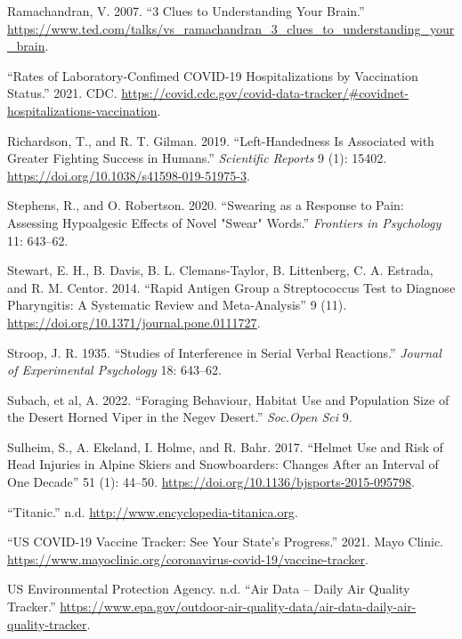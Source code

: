 \documentclass[
]{report}
\newlength{\cslhangindent}
\newenvironment{CSLReferences}[2] %
 {\begin{list}{}{%
  \setlength{\itemindent}{0pt}
  \setlength{\leftmargin}{0pt}
  \setlength{\parsep}{0pt}
  \ifodd #1
   \setlength{\leftmargin}{\cslhangindent}
   \setlength{\itemindent}{-1\cslhangindent}
  \fi
  \setlength{\itemsep}{#2\baselineskip}}}
 {\end{list}}
\begin{document}
\begin{CSLReferences}{1}{0}
Ramachandran, V. 2007. {``3 Clues to Understanding Your Brain.''} \url{https://www.ted.com/talks/vs_ramachandran_3_clues_to_understanding_your_brain}.

{``Rates of Laboratory-Confimed COVID-19 Hospitalizations by Vaccination Status.''} 2021. CDC. \url{https://covid.cdc.gov/covid-data-tracker/\#covidnet-hospitalizations-vaccination}.

Richardson, T., and R. T. Gilman. 2019. {``Left-Handedness Is Associated with Greater Fighting Success in Humans.''} \emph{Scientific Reports} 9 (1): 15402. \url{https://doi.org/10.1038/s41598-019-51975-3}.

Stephens, R., and O. Robertson. 2020. {``Swearing as a Response to Pain: Assessing Hypoalgesic Effects of Novel "Swear" Words.''} \emph{Frontiers in Psychology} 11: 643--62.

Stewart, E. H., B. Davis, B. L. Clemans-Taylor, B. Littenberg, C. A. Estrada, and R. M. Centor. 2014. {``Rapid Antigen Group a Streptococcus Test to Diagnose Pharyngitis: A Systematic Review and Meta-Analysis''} 9 (11). \url{https://doi.org/10.1371/journal.pone.0111727}.

Stroop, J. R. 1935. {``Studies of Interference in Serial Verbal Reactions.''} \emph{Journal of Experimental Psychology} 18: 643--62.

Subach, et al, A. 2022. {``Foraging Behaviour, Habitat Use and Population Size of the Desert Horned Viper in the Negev Desert.''} \emph{Soc.Open Sci} 9.

Sulheim, S., A. Ekeland, I. Holme, and R. Bahr. 2017. {``Helmet Use and Risk of Head Injuries in Alpine Skiers and Snowboarders: Changes After an Interval of One Decade''} 51 (1): 44--50. \url{https://doi.org/10.1136/bjsports-2015-095798}.

{``Titanic.''} n.d. \url{http://www.encyclopedia-titanica.org}.

{``US COVID-19 Vaccine Tracker: See Your State's Progress.''} 2021. Mayo Clinic. \url{https://www.mayoclinic.org/coronavirus-covid-19/vaccine-tracker}.

US Environmental Protection Agency. n.d. {``Air Data -- Daily Air Quality Tracker.''} \url{https://www.epa.gov/outdoor-air-quality-data/air-data-daily-air-quality-tracker}.


\end{CSLReferences}
\end{document}
